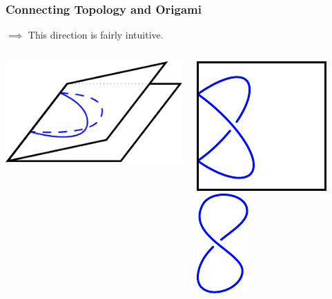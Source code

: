 \documentclass{beamer}
\begin{document}
\begin{frame}
\frametitle{Connecting Topology and Origami}
\begin{block}{$\implies$}
This direction is fairly intuitive. 
\end{block}
\begin{columns}[c]
\begin{center}
\includegraphics[width=.8\textwidth]{knot_pix/trivial-2.pdf}
\end{center}
\pause
{}
\includegraphics[width=.7\textwidth]{knot_pix/trivial-3.pdf}
\pause
{}
\includegraphics[width=.5\textwidth]{knot_pix/trivial-4.pdf}

\end{columns}
\end{frame}
\end{document}
